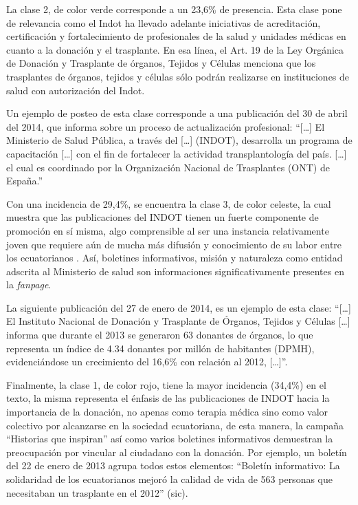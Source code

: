 \documentclass[spanish]{textolivre}
\begin{document}
La clase 2, de color verde corresponde a un 23,6\% de presencia. Esta clase pone de relevancia como el Indot ha llevado adelante iniciativas de acreditación, certificación y fortalecimiento de profesionales de la salud y unidades médicas en cuanto a la donación y el trasplante. En esa línea, el Art. 19 de la Ley Orgánica de Donación y Trasplante de órganos, Tejidos y Células \cite{indot2011}  menciona que los trasplantes de órganos, tejidos y células sólo podrán realizarse en instituciones de salud con autorización del Indot. 

Un ejemplo de posteo de esta clase corresponde a una publicación del 30 de abril del 2014, que informa sobre un proceso de actualización profesional: “[…] El Ministerio de Salud Pública, a través del […] (INDOT), desarrolla un programa de capacitación […] con el fin de fortalecer la actividad transplantología del país. […] el cual es coordinado por la Organización Nacional de Trasplantes (ONT) de España.”  

Con una incidencia de 29,4\%, se encuentra la clase 3, de color celeste, la cual muestra que las publicaciones del INDOT tienen un fuerte componente de promoción en sí misma, algo comprensible al ser una instancia relativamente joven que requiere aún de mucha más difusión y conocimiento de su labor entre los ecuatorianos \cite{dos_santos2020}. Así, boletines informativos, misión y naturaleza como entidad adscrita al Ministerio de salud son informaciones significativamente presentes en la \emph{fanpage}. 

La siguiente publicación del 27 de enero de 2014, es un ejemplo de esta clase: “[…] El Instituto Nacional de Donación y Trasplante de Órganos, Tejidos y Células […] informa que durante el 2013 se generaron 63 donantes de órganos, lo que representa un índice de 4.34 donantes por millón de habitantes (DPMH), evidenciándose un crecimiento del 16,6\% con relación al 2012, […]”. 

Finalmente, la clase 1, de color rojo, tiene la mayor incidencia (34,4\%) en el texto, la misma representa el énfasis de las publicaciones de INDOT hacia la importancia de la donación, no apenas como terapia médica sino como valor colectivo por alcanzarse en la sociedad ecuatoriana, de esta manera, la campaña “Historias que inspiran” así como varios boletines informativos demuestran la preocupación por vincular al ciudadano con la donación. Por ejemplo, un boletín del 22 de enero de 2013 agrupa todos estos elementos: “Boletín informativo: La solidaridad de los ecuatorianos mejoró la calidad de vida de 563 personas que necesitaban un trasplante en el 2012” (sic). 
\end{document}
